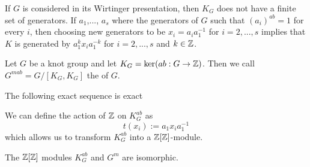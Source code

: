 If $G$ is considered in its Wirtinger presentation, then $K_G$ does not have a finite set of generators. If $a_1$,..., $a_s$ where the generators of $G$ such that $(a_i)^{ab}=1$ for every $i$, then choosing new generators to be $x_i=a_ia_1^{-1}$ for $i=2,..., s$ implies that $K$ is generated by $a_1^{k}x_ia_1^{-k}$ for $i=2,...,s$ and $k\in\operatorname{\mathbb{Z}}$.

\begin{definition}[metabelianization]
  Let $G$ be a knot group and let $K_G=\ker(ab:G\to \operatorname{\mathbb{Z}})$. Then we call $G^{mab}=G/[K_G, K_G]$ the  of $G$. 
\end{definition}

{\color{blue}
The following exact sequence is exact
\begin{center}
\end{center}
We can define the action of $\operatorname{\mathbb{Z}}$ on $K_G^{ab}$ as 
$$t(x_i):=a_1x_ia_1^{-1}$$
which allows us to transform $K_G^{ab}$ into a $\operatorname{\mathbb{Z}}[\operatorname{\mathbb{Z}}]$-module.
}

\begin{lemma}
  The $\operatorname{\mathbb{Z}}[\operatorname{\mathbb{Z}}]$ modules $K_G^{ab}$ and $G^m$ are isomorphic.
\end{lemma}

